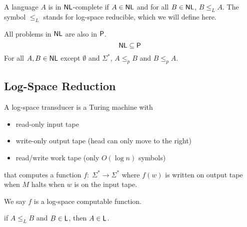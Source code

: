 A language $A$ is in $\mathsf{NL}$-complete if $A \in \mathsf{NL}$ and for all $B \in \mathsf{NL}$, $B \leq_L A$. The symbol $\leq_L$ stands for log-space reducible, which we will define here.

All problems in $\mathsf{NL}$ are also in $\mathsf{P}$.
$$
\mathsf{NL} \subseteq \mathsf{P}
$$
For all $A,B \in \mathsf{NL}$ except $\emptyset$ and $\Sigma^*$, $A \leq_p B$ and $B \leq_p A$.

\subsection{Log-Space Reduction}

A log-space transducer is a Turing machine with
\begin{itemize}
    \item read-only input tape
    \item write-only output tape (head can only move to the right)
    \item read/write work tape (only $O(\log n)$ symbols)
\end{itemize}
that computes a function $f:\; \Sigma^* \to \Sigma^*$ where $f(w)$ is written on output tape when $M$ halts when $w$ is on the input tape.

We say $f$ is a log-space computable function.

\begin{theorem}
    if $A \leq_L B$ and $B \in \mathsf{L}$, then $A \in \mathsf{L}$.
\end{theorem}

